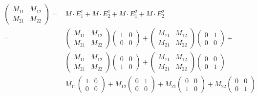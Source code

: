 \documentclass[10pt,a4paper]{article}
\begin{document}
	\begin{equation}
	\begin{aligned}
	\begin{pmatrix}
	M_{11} & M_{12} \\ M_{21} & M_{22}
	\end{pmatrix} 
	=& 
	M\cdot E_1^1 + M\cdot E_2^1 + M\cdot E_1^2 + M\cdot E_2^2 
	\\=& 
	\begin{pmatrix}	M_{11} & M_{12} \\ M_{21} & M_{22}	\end{pmatrix} 
	\begin{pmatrix}	1 & 0 \\ 0 & 0 	\end{pmatrix}+
	\begin{pmatrix}	M_{11} & M_{12} \\ M_{21} & M_{22}	\end{pmatrix} 
	\begin{pmatrix}	0 & 1 \\ 0 & 0 	\end{pmatrix}+
	\\&
	\begin{pmatrix}	M_{11} & M_{12} \\ M_{21} & M_{22}	\end{pmatrix} 
	\begin{pmatrix}	0 & 0 \\ 1 & 0 	\end{pmatrix}+
	\begin{pmatrix}	M_{11} & M_{12} \\ M_{21} & M_{22}	\end{pmatrix} 
	\begin{pmatrix}	0 & 0 \\ 0 & 1 	\end{pmatrix}
	\\=&
	M_{11}\begin{pmatrix}	1 & 0 \\ 0 & 0 	\end{pmatrix}+
	M_{12}\begin{pmatrix}	0 & 1 \\ 0 & 0 	\end{pmatrix}+
	M_{21}\begin{pmatrix}	0 & 0 \\ 1 & 0 	\end{pmatrix}+ 
	M_{22}\begin{pmatrix}	0 & 0 \\ 0 & 1 	\end{pmatrix}

\end{aligned}
\end{equation}
\end{document}
